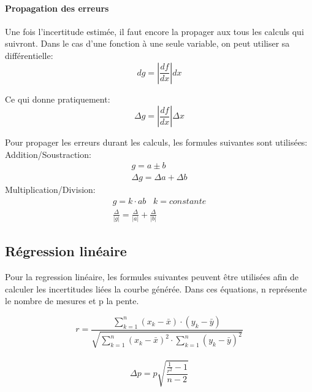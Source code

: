 \paragraph{Propagation des erreurs}
Une fois l'incertitude estimée, il faut encore la propager aux tous les calculs qui suivront. Dans le cas d'une fonction à une seule variable, on peut utiliser sa différentielle:
\begin{equation}
    dg=|{\frac{df}{dx}}|dx
\end{equation}

Ce qui donne pratiquement:
\begin{equation}
    \Delta g=|\frac{df}{dx}|\Delta x
\end{equation}

Pour propager les erreurs durant les calculs, les formules suivantes sont utilisées:\\
Addition/Soustraction:
\begin{equation}
    \begin{split}
	g = a \pm b\\
	\Delta g = \Delta a + \Delta b
    \end{split}
\end{equation}
Multiplication/Division:
\begin{equation}
    \begin{split}
	g = k\cdot ab \;\;\; k=constante\\
	\frac{\Delta}{|g|} = \frac{\Delta}{|a|} + \frac{\Delta}{|b|}
    \end{split}
\end{equation}

\subsection{Régression linéaire}

Pour la regression linéaire, les formules suivantes peuvent être utilisées afin de calculer les incertitudes liées la courbe générée.
Dans ces équations, n représente le nombre de mesures et p la pente.

\begin{equation}
    \label{regressionr}
    r=\frac{\sum_{k=1}^{n}(x_k-\bar{x})\cdot(y_k-\bar{y})}{\sqrt{\sum_{k=1}^{n}(x_k-\bar{x})^2\cdot\sum_{k=1}^{n}(y_k-\bar{y})^2}}
\end{equation}
\\

\begin{equation}
    \label{deltam}
    \Delta p=p\sqrt{\frac{\frac{1}{r^2}-1}{n-2}}
\end{equation}
